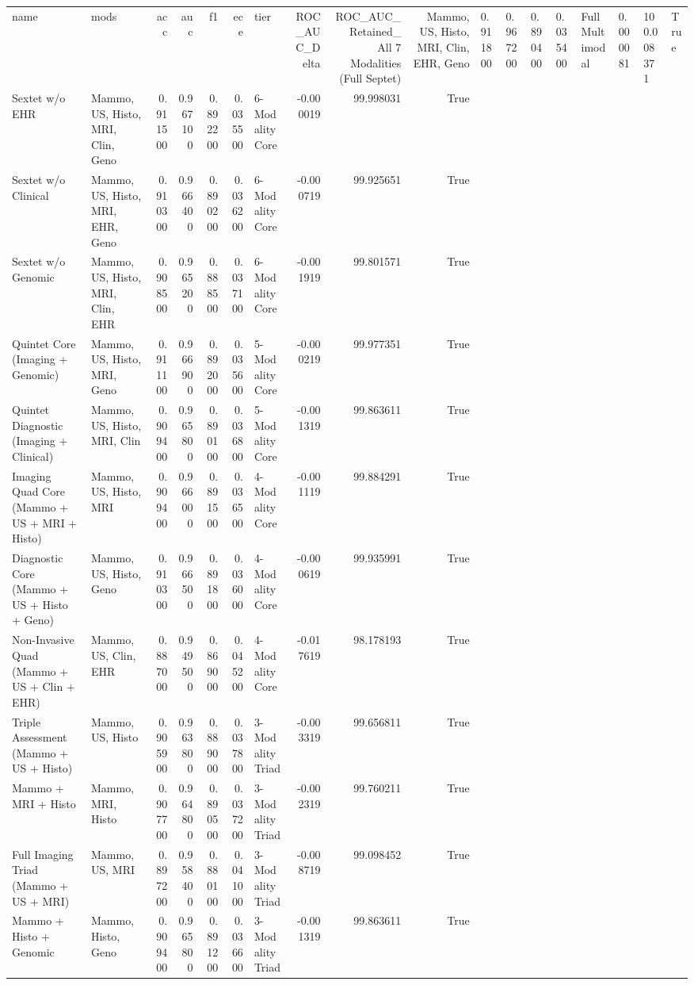 \begin{tabular}{llrrrrlrrr}
\toprule
name & mods & acc & auc & f1 & ece & tier & ROC_AUC_Delta & ROC_AUC_Retained_%
\midrule
All 7 Modalities (Full Septet) & Mammo, US, Histo, MRI, Clin, EHR, Geno & 0.911800 & 0.967200 & 0.890400 & 0.035400 & Full Multimodal & 0.000081 & 100.008371 & True \\
Sextet w/o EHR & Mammo, US, Histo, MRI, Clin, Geno & 0.911500 & 0.967100 & 0.892200 & 0.035500 & 6-Modality Core & -0.000019 & 99.998031 & True \\
Sextet w/o Clinical & Mammo, US, Histo, MRI, EHR, Geno & 0.910300 & 0.966400 & 0.890200 & 0.036200 & 6-Modality Core & -0.000719 & 99.925651 & True \\
Sextet w/o Genomic & Mammo, US, Histo, MRI, Clin, EHR & 0.908500 & 0.965200 & 0.888500 & 0.037100 & 6-Modality Core & -0.001919 & 99.801571 & True \\
Quintet Core (Imaging + Genomic) & Mammo, US, Histo, MRI, Geno & 0.911100 & 0.966900 & 0.892000 & 0.035600 & 5-Modality Core & -0.000219 & 99.977351 & True \\
Quintet Diagnostic (Imaging + Clinical) & Mammo, US, Histo, MRI, Clin & 0.909400 & 0.965800 & 0.890100 & 0.036800 & 5-Modality Core & -0.001319 & 99.863611 & True \\
Imaging Quad Core (Mammo + US + MRI + Histo) & Mammo, US, Histo, MRI & 0.909400 & 0.966000 & 0.891500 & 0.036500 & 4-Modality Core & -0.001119 & 99.884291 & True \\
Diagnostic Core (Mammo + US + Histo + Geno) & Mammo, US, Histo, Geno & 0.910300 & 0.966500 & 0.891800 & 0.036000 & 4-Modality Core & -0.000619 & 99.935991 & True \\
Non-Invasive Quad (Mammo + US + Clin + EHR) & Mammo, US, Clin, EHR & 0.887000 & 0.949500 & 0.869000 & 0.045200 & 4-Modality Core & -0.017619 & 98.178193 & True \\
Triple Assessment (Mammo + US + Histo) & Mammo, US, Histo & 0.905900 & 0.963800 & 0.889000 & 0.037800 & 3-Modality Triad & -0.003319 & 99.656811 & True \\
Mammo + MRI + Histo & Mammo, MRI, Histo & 0.907700 & 0.964800 & 0.890500 & 0.037200 & 3-Modality Triad & -0.002319 & 99.760211 & True \\
Full Imaging Triad (Mammo + US + MRI) & Mammo, US, MRI & 0.897200 & 0.958400 & 0.880100 & 0.041000 & 3-Modality Triad & -0.008719 & 99.098452 & True \\
Mammo + Histo + Genomic & Mammo, Histo, Geno & 0.909400 & 0.965800 & 0.891200 & 0.036600 & 3-Modality Triad & -0.001319 & 99.863611 & True \\

\end{tabular}
